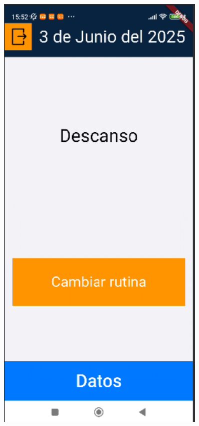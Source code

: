 \begin{figure}[H]
\begin{minipage}{0.4\textwidth}
      \label{fig:CalendarioEventos}
   \end{minipage}
   \hspace{0.5cm}
   \begin{minipage}{0.4\textwidth}
      \centering
      \includegraphics[width=0.9\textwidth]{pantallas/descanso.png}

\end{minipage}
\end{figure}
